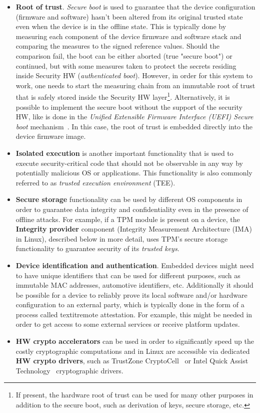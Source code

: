 \begin{itemize}
	\item \textbf{Root of trust}. \textit{Secure boot} is used to guarantee that the device configuration (firmware and software) hasn't been altered from its original trusted state even when the device is in the offline state. This is typically done by measuring each component of the device firmware and software stack and comparing the measures to the signed reference values. Should the comparison fail, the boot can be either aborted (true "secure boot") or continued, but with some measures taken to protect the secrets residing inside Security HW (\textit{authenticated boot}). However, in order for this system to work, one needs to start the measuring chain from an immutable root of trust that is safely stored inside the Security HW layer\footnote{If present, the hardware root of trust can be used for many other purposes in addition to the secure boot, such as derivation of keys, secure storage, etc.}. Alternatively, it is possible to implement the secure boot without the support of the security HW, like is done in the \textit{Unified Extensible Firmware Interface (UEFI) Secure boot} mechanism~\cite{uefi}. In this case, the root of trust is embedded directly into the device firmware image.
	\item \textbf{Isolated execution} is another important functionality that is used to execute security-critical code that should not be observable in any way by potentially malicious OS or applications. This functionality is also commonly referred to as \textit{trusted execution environment} (TEE).
	\item \textbf{Secure storage} functionality can be used by different OS components in order to guarantee data integrity and confidentiality even in the presence of offline attacks. For example, if a TPM module is present on a device, the \textbf{Integrity provider} component (Integrity Measurement Architecture (IMA) in Linux), described below in more detail, uses TPM's secure storage functionality to guarantee security of its \textit{trusted keys}.
	\item \textbf{Device identification and authentication}. Embedded devices might need to have unique identifiers that can be used for different purposes, such as immutable MAC addresses, automotive identifiers, etc.  Additionally it should be possible for a device to reliably prove its local software and/or hardware configuration to an external party, which is typically done in the form of a process called textit{remote attestation}. For example, this might be needed in order to get access to some external services or receive platform updates.
	\item \textbf{HW crypto accelerators} can be used in order to significantly speed up the costly cryptographic computations and in Linux are accessible via dedicated \textbf{HW crypto drivers}, such as TrustZone CryptoCell~\cite{cryptocell} or Intel Quick Assist Technology~\cite{intelQAT} cryptographic drivers.
\end{itemize}

